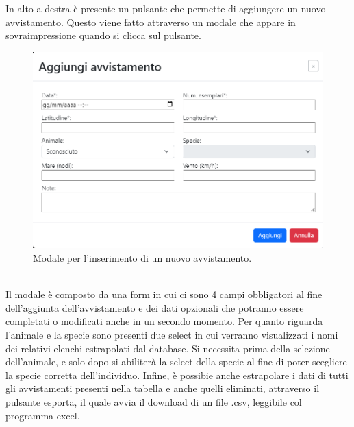 \documentclass[a4paper,final,12pt]{report}
\begin{document}
In alto a destra è presente un pulsante che permette di aggiungere un nuovo avvistamento. Questo viene fatto attraverso un modale che appare in sovraimpressione quando si clicca sul pulsante.
\begin{figure}[hbtp]
\centering
\includegraphics[scale=0.50]{img_concettuale/aggiungiAvv.png}
\caption{Modale per l'inserimento di un nuovo avvistamento.}
\end{figure}
\\ Il modale è composto da una form in cui ci sono 4 campi obbligatori al fine dell'aggiunta dell'avvistamento e dei dati opzionali che potranno essere completati o modificati anche in un secondo momento. Per quanto riguarda l'animale e la specie sono presenti due select in cui verranno visualizzati i nomi dei relativi elenchi estrapolati dal database. Si necessita prima della selezione dell'animale, e solo dopo si abiliterà la select della specie al fine di poter scegliere la specie corretta dell'individuo.
Infine, è possibie anche estrapolare i dati di tutti gli avvistamenti presenti nella tabella e anche quelli eliminati, attraverso il pulsante esporta, il quale avvia il download di un file .csv, leggibile col programma excel. 
\end{document}
